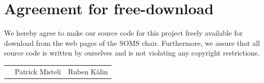 \documentclass[11pt]{article}
\begin{document}
\graphicspath{{Images/}}


\newpage


\newpage
\section*{Agreement for free-download}
\bigskip


\bigskip


\large We hereby agree to make our source code for this project freely available for download from the web pages of the SOMS chair. Furthermore, we assure that all source code is written by ourselves and is not violating any copyright restrictions.

\begin{center}

\bigskip


\bigskip


\begin{tabular}{@{}p{3.3cm}@{}p{6cm}@{}@{}p{6cm}@{}}
\begin{minipage}{3cm}

\end{minipage}
&
\begin{minipage}{6cm}
\vspace{2mm} \large Patrick Misteli

 \vspace{\baselineskip}

\end{minipage}
&
\begin{minipage}{6cm}

\large Ruben K{\"a}lin

\end{minipage}
\end{tabular}


\end{center}
\newpage







\tableofcontents

\newpage
\end{document}
